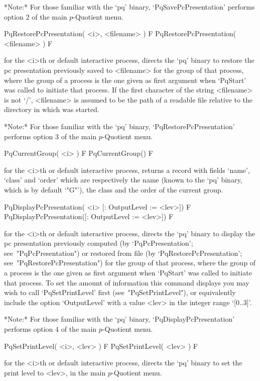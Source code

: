 *Note:* For those familiar with the `pq'  binary,  `PqSavePcPresentation'
performs option 2 of the main $p$-Quotient menu.

\>PqRestorePcPresentation( <i>, <filename> ) F
\>PqRestorePcPresentation( <filename> ) F

for the <i>th or default interactive {\ANUPQ} process, directs  the  `pq'
binary to restore the pc presentation previously saved to <filename>  for
the group of that process, where the group of a process is the one  given
as first argument when `PqStart' was called to initiate that process.  If
the first character of the string <filename> is not  `/',  <filename>  is
assumed to be the path of a readable file relative to  the  directory  in
which {\GAP} was started.

*Note:*
For  those  familiar  with  the  `pq'  binary,  `PqRestorePcPresentation'
performs option 3 of the main $p$-Quotient menu.

\>PqCurrentGroup( <i> ) F
\>PqCurrentGroup() F

for the <i>th or default interactive {\ANUPQ} process, returns  a  record
with fields `name', `class' and `order' which are respectively  the  name
(known to the `pq' binary, which is by default `"G"'), the class and  the
order of the current group.

\>PqDisplayPcPresentation( <i> [: OutputLevel := <lev>]) F
\>PqDisplayPcPresentation([: OutputLevel := <lev>]) F

for the <i>th or default interactive {\ANUPQ} process, directs  the  `pq'
binary  to  display  the  pc   presentation   previously   computed   (by
`PqPcPresentation'; see~"PqPcPresentation") or  restored  from  file  (by
`PqRestorePcPresentation'; see~"PqRestorePcPresentation") for  the  group
of that process, where the group of a process is the one given  as  first
argument when `PqStart' was called to initiate that process. To  set  the
amount of  information  this  command  displays  you  may  wish  to  call
`PqSetPrintLevel' first (see~"PqSetPrintLevel"), or equivalently  include
the option  `OutputLevel'  with  a  value  <lev>  in  the  integer  range
`[0..3]'.

*Note:*
For  those  familiar  with  the  `pq'  binary,  `PqDisplayPcPresentation'
performs option 4 of the main $p$-Quotient menu.

\>PqSetPrintLevel( <i>, <lev> ) F
\>PqSetPrintLevel( <lev> ) F

for the <i>th or default interactive {\ANUPQ} process, directs  the  `pq'
binary to set the print level to <lev>, in the main $p$-Quotient menu.

